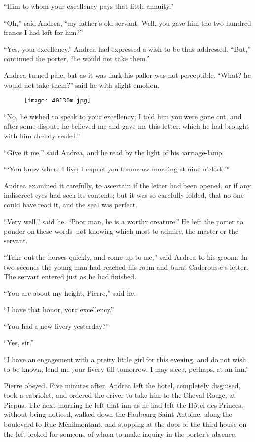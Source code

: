 “Him to whom your excellency pays that little annuity.”

“Oh,” said Andrea, “my father’s old servant. Well, you gave him the two
hundred francs I had left for him?”

“Yes, your excellency.” Andrea had expressed a wish to be thus
addressed. “But,” continued the porter, “he would not take them.”

Andrea turned pale, but as it was dark his pallor was not perceptible.
“What? he would not take them?” said he with slight emotion.

\begin{figure}[ht]
\texttt{[image: 40130m.jpg]}
\end{figure}

“No, he wished to speak to your excellency; I told him you were gone
out, and after some dispute he believed me and gave me this letter,
which he had brought with him already sealed.”

“Give it me,” said Andrea, and he read by the light of his
carriage-lamp:

“‘You know where I live; I expect you tomorrow morning at nine
o’clock.’”

Andrea examined it carefully, to ascertain if the letter had been
opened, or if any indiscreet eyes had seen its contents; but it was so
carefully folded, that no one could have read it, and the seal was
perfect.

“Very well,” said he. “Poor man, he is a worthy creature.” He left the
porter to ponder on these words, not knowing which most to admire, the
master or the servant.

“Take out the horses quickly, and come up to me,” said Andrea to his
groom. In two seconds the young man had reached his room and burnt
Caderousse’s letter. The servant entered just as he had finished.

“You are about my height, Pierre,” said he.

“I have that honor, your excellency.”

“You had a new livery yesterday?”

“Yes, sir.”

“I have an engagement with a pretty little girl for this evening, and
do not wish to be known; lend me your livery till tomorrow. I may
sleep, perhaps, at an inn.”

Pierre obeyed. Five minutes after, Andrea left the hotel, completely
disguised, took a cabriolet, and ordered the driver to take him to the
Cheval Rouge, at Picpus. The next morning he left that inn as he had
left the Hôtel des Princes, without being noticed, walked down the
Faubourg Saint-Antoine, along the boulevard to Rue Ménilmontant, and
stopping at the door of the third house on the left looked for someone
of whom to make inquiry in the porter’s absence.

